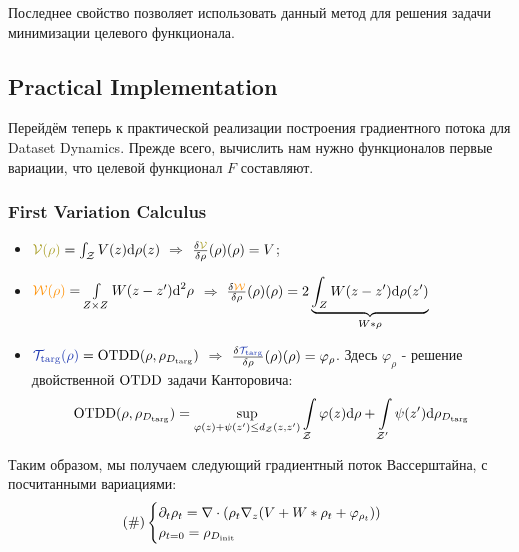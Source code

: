 Последнее свойство позволяет использовать данный метод для решения задачи минимизации целевого функционала.

\subsection{Practical Implementation}

Перейдём теперь к практической реализации построения градиентного потока для Dataset Dynamics. Прежде всего, вычислить нам нужно функционалов первые вариации, что целевой функционал $F$ составляют. 
\subsubsection{First Variation Calculus}

\begin{itemize}
    \item $\olive{\cV(\rho)} = \int_{\cZ}V(z) \dd \rho(z)$ $\Rightarrow$ $\fdv{\olive{\cV}}{\rho}(\rho)(\rho) = V$; 
    \item $\sunset{\cW(\rho)} = \int\limits_{Z \times Z} W(z - z') \dd^2 \rho$ $\Rightarrow$ $\fdv{\sunset{\cW}}{\rho}(\rho)(\rho) = 2 \underbrace{\int_{Z}W(z-z') \dd \rho(z')}_{W * \rho}$
    \item  $\twilight{\cT_{\targ}(\rho)} = \otdd(\rho, \rho_{D_{\targ}})$ $\Rightarrow$ $\fdv{\twilight{\cT_{\targ}}}{\rho}(\rho)(\rho) = \varphi_{\rho}$. Здесь $\varphi_{\rho}$ - решение двойственной $\text{OTDD}$ задачи Канторовича:
    \vspace{-2mm}
    \begin{gather*} \text{OTDD}(\rho, \rho_{D_{\text{targ}}}) = \sup\limits_{\varphi(z) + \psi(z') \leq d_{\mathcal{Z}}(z, z')} \int\limits_{\mathcal{Z}} \varphi(z) \text{d} \rho + \int\limits_{\mathcal{Z}'} \psi(z') \text{d} \rho_{D_{\text{targ}}}
    \end{gather*}
\end{itemize}
Таким образом, мы получаем следующий градиентный поток Вассерштайна, с посчитанными вариациями: 
\begin{gather*}
    (\#)\begin{cases}
        \partial_t \rho_t =  \mathbf{\nabla} \cdot (\rho_t \nabla_{z} (V + W * \rho_t + \varphi_{\rho_t})) \\
        \rho_{t = 0} = \rho_{D_{\text{init}}}
    \end{cases}  
\end{gather*}

